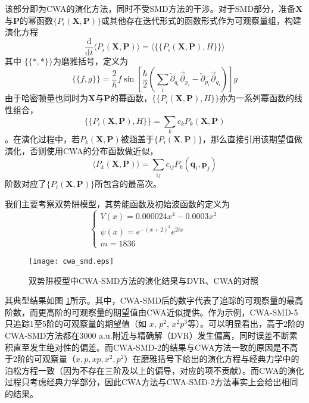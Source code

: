 该部分即为CWA的演化方法，同时不受SMD方法的干涉。对于SMD部分，准备$\boldsymbol{X}$与$\boldsymbol{P}$的幂函数$\{P_i(\boldsymbol{X},\boldsymbol{P})\}$或其他存在迭代形式的函数形式作为可观察量组，构建演化方程
\begin{equation}
\frac{\mathrm{d}}{\mathrm{d} t} \langle P_i(\boldsymbol{X},\boldsymbol{P}) \rangle = \langle \{\{P_i(\boldsymbol{X},\boldsymbol{P}), H\}\} \rangle
\end{equation}
其中 $\{\{ *, * \}\}$为磨雅括号，定义为
 \begin{equation}
	 \{\{f, g\}\}=\frac{2}{\hbar} f \sin \left[\frac{\hbar}{2}\left(\sum_{i} \overleftarrow{\partial}_{q_{i}} \overrightarrow{\partial}_{p_{i}}-\overleftarrow{\partial}_{p_{i}} \overrightarrow{\partial}_{q_{i}}\right)\right] g
\end{equation}
由于哈密顿量也同时为$\boldsymbol{X}$与$\boldsymbol{P}$的幂函数，$\{\{P_i(\boldsymbol{X},\boldsymbol{P}), H\}\}$亦为一系列幂函数的线性组合，
\begin{equation}
\{\{P_i(\boldsymbol{X},\boldsymbol{P}), H\}\} = \sum_k c_k P_k(\boldsymbol{X},\boldsymbol{P})
\end{equation}
。在演化过程中，若$P_k(\boldsymbol{X},\boldsymbol{P})$被涵盖于$\{P_i(\boldsymbol{X},\boldsymbol{P})\}$，那么直接引用该期望值做演化，否则使用CWA的分布函数做近似，
\begin{equation}
\langle P_k(\boldsymbol{X},\boldsymbol{P}) \rangle = \sum_{ij} c_{ij} P_k(\boldsymbol{q}_i,\boldsymbol{p}_j)
\end{equation}
阶数对应了$\{P_i(\boldsymbol{X},\boldsymbol{P})\}$所包含的最高次。

我们主要考察双势阱模型，其势能函数及初始波函数的定义为
\begin{equation}
\begin{cases}
V(x) = 0.000024 x^4 - 0.0003 x^2 \\
\psi(x) = e^{-(x+2)^2} e^{2ix} \\
m = 1836
\end{cases}
\end{equation}

\begin{figure}
\centering
\texttt{[image: cwa\_smd.eps]}
\caption{双势阱模型中CWA-SMD方法的演化结果与DVR、CWA的对照}
\label{cwa-smd-double-well}
\end{figure}
其典型结果如图 \ref{cwa-smd-double-well}所示。其中，CWA-SMD后的数字代表了追踪的可观察量的最高阶数，而更高阶的可观察量的期望值由CWA近似提供。作为示例，CWA-SMD-5只追踪1至5阶的可观察量的期望值（如 $x$, $p^2$, $x^2 p^3$等）。可以明显看出，高于2阶的CWA-SMD方法都在3000 a.u.附近与精确解（DVR）发生偏离，同时误差不断累积直至发生绝对性的偏差。而CWA-SMD-2的结果与CWA方法一致的原因是不高于2阶的可观察量（$x, p, xp, x^2, p^2$）在磨雅括号下给出的演化方程与经典力学中的泊松方程一致（因为不存在三阶及以上的偏导，对应的项不贡献）。而CWA的演化过程只考虑经典力学部分，因此CWA方法与CWA-SMD-2方法事实上会给出相同的结果。

